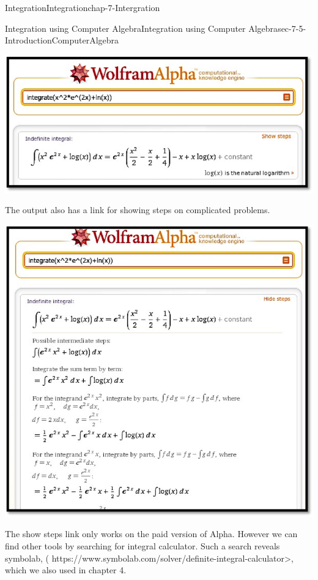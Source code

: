 \documentclass[oneside,10pt,]{book}
\numberwithin{equation}{section}
\begin{document}
\begin{chapterptx}{Integration}{}{Integration}{}{}{chap-7-Intergration}
\begin{sectionptx}{Integration using Computer Algebra}{}{Integration using Computer Algebra}{}{}{sec-7-5-IntroductionComputerAlgebra}
\begin{sidebyside}{1}{0.1}{0.1}{0}%
\begin{sbspanel}{0.8}%
\includegraphics[width=1\linewidth]{images/sec7-5-7.png}
\end{sbspanel}%
\end{sidebyside}%
\par
\hypertarget{p-2889}{}%
The output also has a link for showing steps on complicated problems.%
\begin{sidebyside}{1}{0.1}{0.1}{0}%
\begin{sbspanel}{0.8}%
\includegraphics[width=1\linewidth]{images/sec7-5-8.png}
\end{sbspanel}%
\end{sidebyside}%
\par
\hypertarget{p-2890}{}%
The show steps link only works on the paid version of Alpha.  However we can find other tools by searching for integral calculator.  Such a search reveals symbolab, ( https:\slash{}\slash{}www.symbolab.com\slash{}solver\slash{}definite-integral-calculator\textgreater{}, which we also used in chapter 4.%

\end{sectionptx}
\end{chapterptx}
\end{document}
